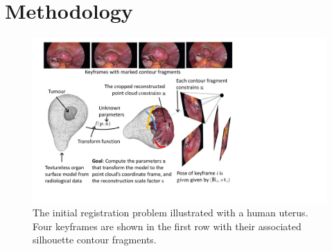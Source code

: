 





\section{Methodology}
\label{sec:ARGuidanceSystem}
\begin{figure}[t]
	\centering
	\includegraphics[width=0.95\columnwidth]{./figs/reconstructionDemo.pdf}
	\caption{The initial registration problem illustrated with a human uterus. Four keyframes are shown in the first row with their associated silhouette contour fragments.}
	\label{fig:initialRegOverview}
\end{figure}

